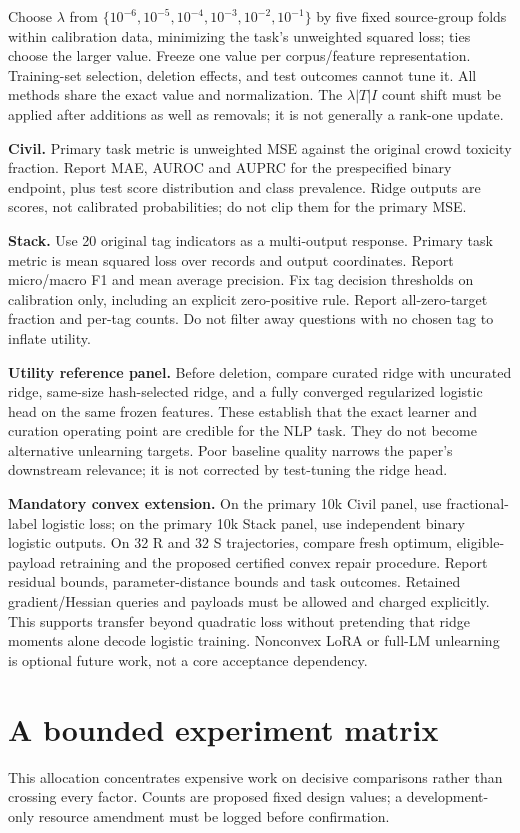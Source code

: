 \documentclass[11pt,a4paper]{article}
\begin{document}
Choose $\lambda$ from $\{10^{-6},10^{-5},10^{-4},10^{-3},10^{-2},10^{-1}\}$ by five fixed source-group folds within calibration data, minimizing the task's unweighted squared loss; ties choose the larger value. Freeze one value per corpus/feature representation. Training-set selection, deletion effects, and test outcomes cannot tune it. All methods share the exact value and normalization. The $\lambda |T| I$ count shift must be applied after additions as well as removals; it is not generally a rank-one update.

\textbf{Civil.} Primary task metric is unweighted MSE against the original crowd toxicity fraction. Report MAE, AUROC and AUPRC for the prespecified binary endpoint, plus test score distribution and class prevalence. Ridge outputs are scores, not calibrated probabilities; do not clip them for the primary MSE.

\textbf{Stack.} Use 20 original tag indicators as a multi-output response. Primary task metric is mean squared loss over records and output coordinates. Report micro/macro F1 and mean average precision. Fix tag decision thresholds on calibration only, including an explicit zero-positive rule. Report all-zero-target fraction and per-tag counts. Do not filter away questions with no chosen tag to inflate utility.

\textbf{Utility reference panel.} Before deletion, compare curated ridge with uncurated ridge, same-size hash-selected ridge, and a fully converged regularized logistic head on the same frozen features. These establish that the exact learner and curation operating point are credible for the NLP task. They do not become alternative unlearning targets. Poor baseline quality narrows the paper's downstream relevance; it is not corrected by test-tuning the ridge head.

\textbf{Mandatory convex extension.} On the primary 10k Civil panel, use fractional-label logistic loss; on the primary 10k Stack panel, use independent binary logistic outputs. On 32 R and 32 S trajectories, compare fresh optimum, eligible-payload retraining and the proposed certified convex repair procedure. Report residual bounds, parameter-distance bounds and task outcomes. Retained gradient/Hessian queries and payloads must be allowed and charged explicitly. This supports transfer beyond quadratic loss without pretending that ridge moments alone decode logistic training. Nonconvex LoRA or full-LM unlearning is optional future work, not a core acceptance dependency.

\section{A bounded experiment matrix}
This allocation concentrates expensive work on decisive comparisons rather than crossing every factor. Counts are proposed fixed design values; a development-only resource amendment must be logged before confirmation.
\end{document}

